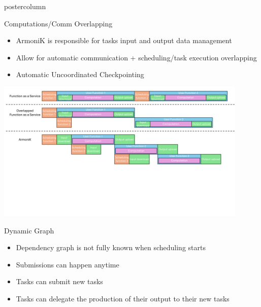 \begin{frame}[fragile]
\begin{columns}[T]
\begin{column}{.49\textwidth}
\begin{beamercolorbox}[center,wd=\textwidth]{postercolumn}
\begin{minipage}[T]{.96\textwidth}
            \begin{block}{Computations/Comm Overlapping}
                \begin{itemize}
                \item ArmoniK is responsible for tasks input and output data management
                \item Allow for automatic communication + scheduling/task execution overlapping
                \item Automatic Uncoordinated Checkpointing
                \end{itemize}
                \vspace{2ex}
                \centering
                \includegraphics[width=0.9\textwidth, trim={0 7cm 0 0}, clip]{pipelining AK 2.pdf}
            \end{block}


            \begin{block}{Dynamic Graph}
            \begin{itemize}
                \item Dependency graph is not fully known when scheduling starts
                \item Submissions can happen anytime
                \item Tasks can submit new tasks
                \item Tasks can delegate the production of their output to their new tasks
            \end{itemize}
            \centering
            \vspace{1cm}
            \vfill
            
            \end{block}


\end{minipage}
\end{beamercolorbox}
\end{column}
\end{columns}
\end{frame}

